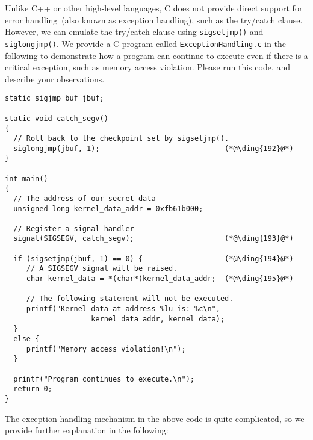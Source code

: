 Unlike C++ or other high-level languages, C does not provide direct support
for error handling~(also 
known as exception handling), such as the try/catch clause. 
However, we can emulate the try/catch clause using \texttt{sigsetjmp()} and \texttt{siglongjmp()}.
We provide a C program called \texttt{ExceptionHandling.c} in the following 
to demonstrate how
a program can continue to execute even if there is a critical exception, such as memory access
violation. Please run this code, and describe your observations. 


\begin{lstlisting}[caption=\texttt{ExceptionHandling.c}]
static sigjmp_buf jbuf;

static void catch_segv()
{
  // Roll back to the checkpoint set by sigsetjmp().
  siglongjmp(jbuf, 1);                             (*@\ding{192}@*)
}

int main()
{ 
  // The address of our secret data
  unsigned long kernel_data_addr = 0xfb61b000;

  // Register a signal handler
  signal(SIGSEGV, catch_segv);                     (*@\ding{193}@*)

  if (sigsetjmp(jbuf, 1) == 0) {                   (*@\ding{194}@*)
     // A SIGSEGV signal will be raised. 
     char kernel_data = *(char*)kernel_data_addr;  (*@\ding{195}@*)

     // The following statement will not be executed.
     printf("Kernel data at address %lu is: %c\n", 
                    kernel_data_addr, kernel_data);
  }
  else {
     printf("Memory access violation!\n");
  }

  printf("Program continues to execute.\n");
  return 0;
}
\end{lstlisting}



The exception handling mechanism in the above code is quite complicated, so we provide further
explanation in the following:

